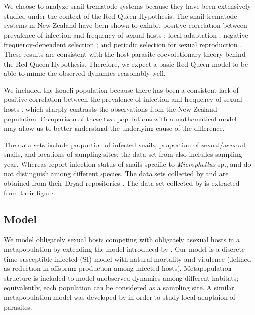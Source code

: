 \documentclass{article}\usepackage[]{graphicx}\usepackage[]{color}
\begin{document}
We choose to analyze snail-trematode systems because they have been extensively studied under the context of the Red Queen Hypothesis.
The snail-trematode systems in New Zealand have been shown to exhibit positive correlation between prevalence of infection and frequency of sexual hosts \citep{lively2002temporal, king2011parasites, vergara2013geographic, mckone2016fine, gibson2016within}; local adaptation \citep{lively1989adaptation, lively2004host, king2011coevolutionary}; negative frequency-dependent selection \citep{dybdahl1995host, dybdahl1998host,jokela2009maintenance, koskella2009evidence}; and periodic selection for sexual reproduction \citep{vergara2014infection, gibson2018periodic}. 
These results are consistent with the host-parasite coevolutionary theory behind the Red Queen Hypothesis.
Therefore, we expect a basic Red Queen model to be able to mimic the observed dynamics reasonably well.

We included the Israeli population because there has been a consistent lack of positive correlation between the prevalence of infection and frequency of sexual hosts \citep{heller1990sexual, ben2005spatial, ben2007temporal, ben2008sex, dagan2013clonal}, which sharply contrasts the observations from the New Zealand population.
Comparison of these two populations with a mathematical model may allow us to better understand the underlying cause of the difference.

The data sets include proportion of infected snails, proportion of sexual/asexual snails, and locations of sampling sites; the data set from \cite{vergara2014infection} also includes sampling year.
Whereas \cite{vergara2014infection} report infection status of snails specific to \textit{Microphallus} sp., \cite{mckone2016fine} and \cite{dagan2013clonal} do not distinguish among different species.
The data sets collected by \cite{dagan2013clonal} and \cite{vergara2014infection} are obtained from their Dryad repositories \citep{dryad_f5t56, dryad_29nk3_2}. 
The data set collected by \cite{mckone2016fine} is extracted from their figure.

\subsection{Model}

We model obligately sexual hosts competing with obligately asexual hosts in a metapopulation by extending the model introduced by \cite{lively2010epidemiological}.
Our model is a discrete time susceptible-infected (SI) model with natural mortality and virulence (defined as reduction in offspring production among infected hosts).
Metapopulation structure is included to model unobserved dynamics among different habitats; equivalently, each population can be considered as a sampling site.
A similar metapopulation model was developed by \cite{lively2018habitat} in order to study local adaptaion of parasites.
\end{document}
